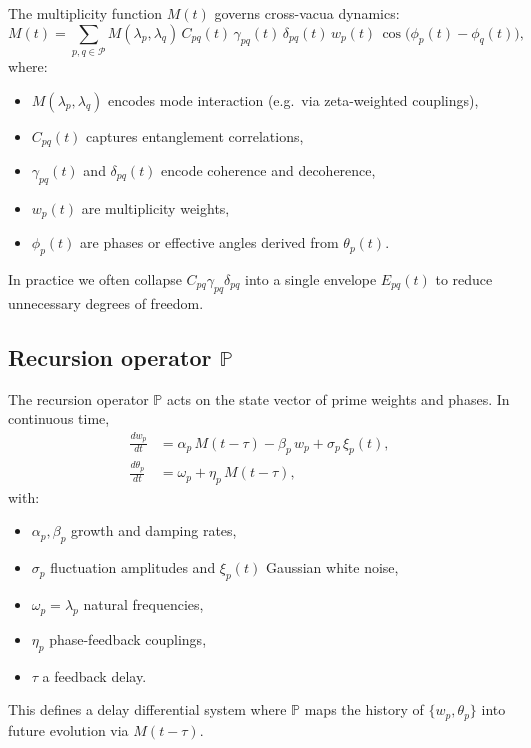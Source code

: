 \documentclass[11pt]{article}
\begin{document}
The multiplicity function \(M(t)\) governs cross-vacua dynamics:
\begin{equation}
  M(t)
  =
  \sum_{p,q\in\mathcal{P}}
  M(\lambda_p, \lambda_q)\,
  C_{pq}(t)\, \gamma_{pq}(t)\, \delta_{pq}(t)\,
  w_p(t)\,
  \cos\bigl(\phi_p(t) - \phi_q(t)\bigr),
\end{equation}
where:
\begin{itemize}
  \item \(M(\lambda_p, \lambda_q)\) encodes mode interaction (e.g.\ via zeta-weighted couplings),
  \item \(C_{pq}(t)\) captures entanglement correlations,
  \item \(\gamma_{pq}(t)\) and \(\delta_{pq}(t)\) encode coherence and decoherence,
  \item \(w_p(t)\) are multiplicity weights,
  \item \(\phi_p(t)\) are phases or effective angles derived from \(\theta_p(t)\).
\end{itemize}
In practice we often collapse \(C_{pq}\gamma_{pq}\delta_{pq}\) into a single envelope \(E_{pq}(t)\) to reduce unnecessary degrees of freedom.

\subsection{Recursion operator \texorpdfstring{\(\mathbb{P}\)}{P}}

The recursion operator \(\mathbb{P}\) acts on the state vector of prime weights and phases.
In continuous time,
\begin{align}
  \frac{d w_p}{dt}
  &= \alpha_p\, M(t-\tau) - \beta_p\, w_p + \sigma_p\, \xi_p(t), \\
  \frac{d \theta_p}{dt}
  &= \omega_p + \eta_p\, M(t-\tau),
\end{align}
with:
\begin{itemize}
  \item \(\alpha_p,\beta_p\) growth and damping rates,
  \item \(\sigma_p\) fluctuation amplitudes and \(\xi_p(t)\) Gaussian white noise,
  \item \(\omega_p = \lambda_p\) natural frequencies,
  \item \(\eta_p\) phase-feedback couplings,
  \item \(\tau\) a feedback delay.
\end{itemize}
This defines a delay differential system where \(\mathbb{P}\) maps the history of \(\{w_p,\theta_p\}\) into future evolution via \(M(t-\tau)\).
\end{document}
